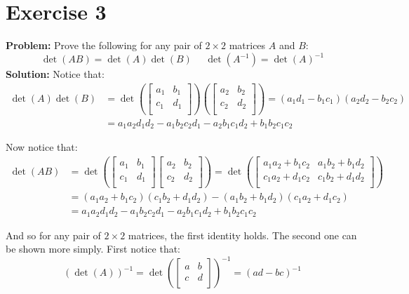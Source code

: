 \documentclass{article}
\begin{document}
\section*{Exercise 3}
\textbf{Problem:} Prove the following for any pair of $2\times2$ matrices $A$ and $B$:
$$\operatorname{det}(AB)=\operatorname{det}(A)\operatorname{det}(B)\ \ \ \ \ \  \operatorname{det}(A^{-1})=\operatorname{det}(A)^{-1}$$
\textbf{Solution:} Notice that:
\begin{align*}
  \operatorname{det}(A)\operatorname{det}(B)&=\operatorname{det}\left(\begin{bmatrix}
      a_1 & b_1 \\
      c_1 & d_1 \\
  \end{bmatrix}\right)
  \left(\begin{bmatrix}
      a_2 & b_2 \\
      c_2 & d_2 \\
  \end{bmatrix}\right)=
  (a_1d_1-b_1c_1)(a_2d_2-b_2c_2)\\
  &=a_1a_2d_1d_2-a_1b_2c_2d_1-a_2b_1c_1d_2+b_1b_2c_1c_2
\end{align*}

Now notice that:
\begin{align*}
  \operatorname{det}(AB)&=\operatorname{det}\left(\begin{bmatrix}
      a_1 & b_1 \\
      c_1 & d_1 \\
  \end{bmatrix}
  \begin{bmatrix}
      a_2 & b_2 \\
      c_2 & d_2 \\
  \end{bmatrix}\right)=\operatorname{det}\left(
  \begin{bmatrix}
      a_1a_2+b_1c_2 & a_1b_2+b_1d_2 \\
      c_1a_2+d_1c_2 & c_1b_2+d_1d_2 \\
  \end{bmatrix}\right)\\
  &=(a_1a_2+b_1c_2)(c_1b_2+d_1d_2)-(a_1b_2+b_1d_2)(c_1a_2+d_1c_2)\\
  &=a_1a_2d_1d_2-a_1b_2c_2d_1-a_2b_1c_1d_2+b_1b_2c_1c_2
\end{align*}

And so for any pair of $2\times2$ matrices, the first identity holds. The second one can be shown more simply. First notice that:
$$(\operatorname{det}(A))^{-1}=\operatorname{det}\left(
\begin{bmatrix}
    a & b \\
    c & d \\
\end{bmatrix}
\right)^{-1}=(ad-bc)^{-1}$$
\end{document}
